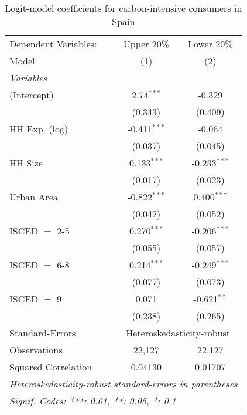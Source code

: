 
\begin{table}[htbp!]
   \centering
   \small
   \begin{adjustbox}{width = 1\textwidth, max height = 0.95\textheight, center}
      \begin{threeparttable}[b]
         \caption{\label{tab:Logit_1_ESP} Logit-model coefficients for carbon-intensive consumers in Spain}
         \begin{tabular}{lcc}
            \tabularnewline \midrule \midrule
            Dependent Variables: & Upper 20\%     & Lower 20\%\\   
            Model                & (1)            & (2)\\  
            \midrule
            \emph{Variables}\\
            (Intercept)          & 2.74$^{***}$   & -0.329\\   
                                 & (0.343)        & (0.409)\\   
            HH Exp. (log)        & -0.411$^{***}$ & -0.064\\   
                                 & (0.037)        & (0.045)\\   
            HH Size              & 0.133$^{***}$  & -0.233$^{***}$\\   
                                 & (0.017)        & (0.023)\\   
            Urban Area           & -0.822$^{***}$ & 0.400$^{***}$\\   
                                 & (0.042)        & (0.052)\\   
            ISCED $=$ 2-5        & 0.270$^{***}$  & -0.206$^{***}$\\   
                                 & (0.055)        & (0.057)\\   
            ISCED $=$ 6-8        & 0.214$^{***}$  & -0.249$^{***}$\\   
                                 & (0.077)        & (0.073)\\   
            ISCED $=$ 9          & 0.071          & -0.621$^{**}$\\   
                                 & (0.238)        & (0.265)\\   
            \midrule 
            Standard-Errors & \multicolumn{2}{c}{Heteroskedasticity-robust} \\ 
            Observations         & 22,127         & 22,127\\  
            Squared Correlation  & 0.04130        & 0.01707\\  
            \midrule \midrule
            \multicolumn{3}{l}{\emph{Heteroskedasticity-robust standard-errors in parentheses}}\\
            \multicolumn{3}{l}{\emph{Signif. Codes: ***: 0.01, **: 0.05, *: 0.1}}\\
         \end{tabular}
         

\end{threeparttable}
\end{adjustbox}
\end{table}
